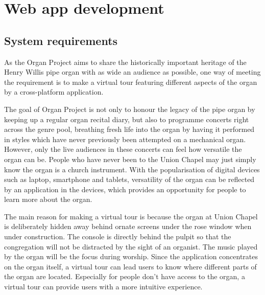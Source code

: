 
\chapter{Web app development}

\section{System requirements}

As the Organ Project aims to share the historically important heritage of the Henry Willis pipe organ with as wide an audience as possible, one way of meeting the requirement is to make a virtual tour featuring different aspects of the organ by a cross-platform application.

The goal of Organ Project is not only to honour the legacy of the pipe organ by keeping up a regular organ recital diary, but also to programme concerts right across the genre pool, breathing fresh life into the organ by having it performed in styles which have never previously been attempted on a mechanical organ. However, only the live audiences in these concerts can feel how versatile the organ can be. People who have never been to the Union Chapel may just simply know the organ is a church instrument. With the popularisation of digital devices such as laptop, smartphone and tablets, versatility of the organ can be reflected by an application in the devices, which provides an opportunity for people to learn more about the organ.

The main reason for making a virtual tour is because the organ at Union Chapel is deliberately hidden away behind ornate screens under the rose window when under construction. The console is directly behind the pulpit so that the congregation will not be distracted by the sight of an organist. The music played by the organ will be the focus during worship. Since the application concentrates on the organ itself, a virtual tour can lead users to know where different parts of the organ are located. Especially for people don't have access to the organ, a virtual tour can provide users with a more intuitive experience.

